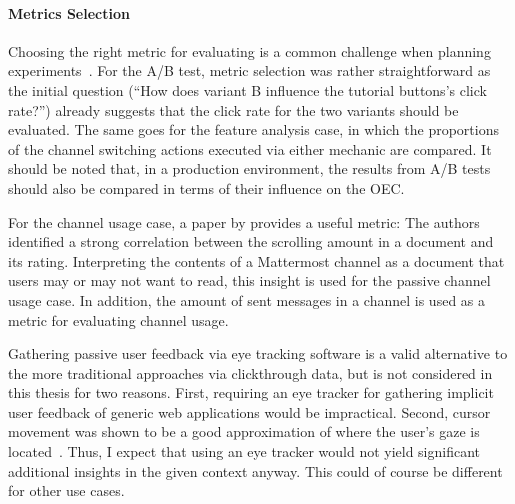\paragraph{Metrics Selection}

Choosing the right metric for evaluating is a common challenge when planning experiments~\cite{lindgren2015software}.
For the A/B test, metric selection was rather straightforward as the initial question (``How does variant B influence the tutorial buttons's click rate?'') already suggests that the click rate for the two variants should be evaluated.
The same goes for the feature analysis case, in which the proportions of the channel switching actions executed via either mechanic are compared.
It should be noted that, in a production environment, the results from A/B tests should also be compared in terms of their influence on the \acf{OEC}.

For the channel usage case, a paper by \citet{Claypool2001} provides a useful metric: The authors identified a strong correlation between the scrolling amount in a document and its rating.
Interpreting the contents of a Mattermost channel as a document that users may or may not want to read, this insight is used for the passive channel usage case.
In addition, the amount of sent messages in a channel is used as a metric for evaluating channel usage.

Gathering passive user feedback via eye tracking software is a valid alternative to the more traditional approaches via clickthrough data, but is not considered in this thesis for two reasons.
First, requiring an eye tracker for gathering implicit user feedback of generic web applications would be impractical.
Second, cursor movement was shown to be a good approximation of where the user's gaze is located~\cite{Huang2011}.
Thus, I expect that using an eye tracker would not yield significant additional insights in the given context anyway.
This could of course be different for other use cases.




